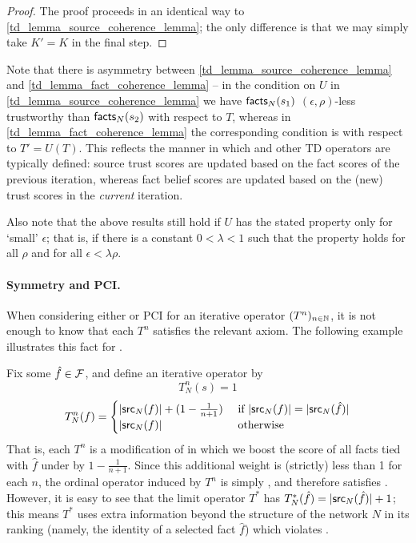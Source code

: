 \begin{proof}
The proof proceeds in an identical way to \cref{td_lemma_source_coherence_lemma};
the only difference is that we may simply
take $K' = K$ in the final step.
\end{proof}

Note that there is asymmetry between \cref{td_lemma_source_coherence_lemma}
and \cref{td_lemma_fact_coherence_lemma} -- in the condition on $U$ in
\cref{td_lemma_source_coherence_lemma} we have $\mathsf{facts}_N(s_1)$ $(\epsilon,
\rho)$-less trustworthy than $\mathsf{facts}_N(s_2)$ with respect to $T$, whereas in
\cref{td_lemma_fact_coherence_lemma} the corresponding condition is with
respect to $T' = U(T)$. This reflects the manner in which \sums{} and other TD
operators are typically defined: source trust scores are updated based on the
fact scores of the previous iteration, whereas fact belief scores are updated
based on the (new) trust scores in the \emph{current} iteration.

Also note that the above results still hold if $U$ has the stated property only
for `small' $\epsilon$; that is, if there is a constant $0 < \lambda < 1$ such
that the property holds for all $\rho$ and for all $\epsilon < \lambda\rho$.

\paragraph{Symmetry and PCI.} When considering either \symmetry{} or PCI
for an iterative operator $(T^n)_{n \in \mathbb{N}}$, it is not enough to know that
each $T^n$ satisfies the relevant axiom. The following example illustrates this
fact for \symmetry{}.

\begin{example}
Fix some $\hat{f} \in \mathcal{F}$, and define an iterative operator by
\[
    T_N^n(s) = 1
\]
\[
    T_N^n(f) = \begin{cases}
        |\mathsf{src}_N(f)| + (1 - \frac{1}{n + 1}) & \text{ if } |\mathsf{src}_N(f)| = |\mathsf{src}_N(\hat{f})| \\
        |\mathsf{src}_N(f)| & \text{ otherwise }
    \end{cases}
\]
That is, each $T^n$ is a modification of \voting{} in which we boost the score
of all facts tied with $\hat{f}$ under \voting{} by $1 - \frac{1}{n+1}$.
Since this additional weight is (strictly) less than 1 for each $n$, the
ordinal operator induced by $T^n$ is simply \voting{}, and therefore satisfies
    \symmetry{}. However, it is easy to see that the limit operator $T^*$ has
$T_N^*(\hat{f}) = |\mathsf{src}_N(\hat{f})| + 1$; this means $T^*$ uses extra
information beyond the structure of the network $N$ in its ranking (namely, the
    identity of a selected fact $\hat{f}$) which violates \symmetry{}.

\end{example}

